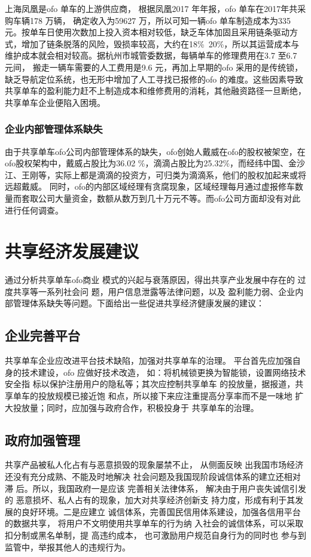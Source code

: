 \documentclass[a4paper,oneside,12pt]{article}
\begin{document}
上海凤凰是ofo 单车的上游供应商， 根据凤凰2017 年年报，ofo 单车在2017年共采购车辆178 万辆， 确定收入为59627 万，所以可知一辆ofo 单车制造成本为335 元。按单车日使用次数加上投入资本相对较低，缺乏车体加固且采用链条驱动方式，增加了链条脱落的风险，毁损率较高，大约在18\%~20\%，所以其运营成本与维护成本就会相对较高。据杭州市城管委数据，每辆单车的修理费用在3.7 至6.7 元间， 搬走一辆车需要的人工费用是9.6 元，再加上早期的ofo 采用的是传统锁，缺乏导航定位系统，也无形中增加了人工寻找已报修的ofo 的难度。这些因素导致共享单车的盈利能力赶不上制造成本和维修费用的消耗，其他融资路径一旦断绝，共享单车企业便陷入困境。


\subsubsection{企业内部管理体系缺失}
由于共享单车ofo公司内部管理体系的缺失，ofo创始人戴威在ofo的股权被架空，在ofo股权架构中，戴威占股比为36.02
\%，滴滴占股比为25.32\%，而经纬中国、金沙江、王刚等，实际上都是滴滴的投资方，可归类为滴滴系，他们的股权加起来或将远超戴威。
同时，ofo的内部区域经理有贪腐现象，区域经理每月通过虚报修车数量而套取公司大量资金，数额从数万到几十万元不等。而ofo公司方面却没有对此进行任何调查。

\section{共享经济发展建议}

通过分析共享单车ofo商业
模式的兴起与衰落原因，得出共享产业发展中存在的
过度共享等一系列社会问
题，用户信息泄露等法律问题，以及
盈利能力弱、企业内部管理体系缺失等问题。下面给出一些促进共享经济健康发展的建议：

\subsection{企业完善平台}
共享单车企业应改进平台技术缺陷，加强对共享单车的治理。
平台首先应加强自身的技术建设，ofo 应做好技术改造，
如：将机械锁更换为智能锁，设置网络技术安全指
标以保护注册用户的隐私等；其次应控制共享单车
的投放量，据报道，共享单车的投放规模已接近饱
和点，所以接下来应注重提高分享率而不是一味地
扩大投放量；同时，应加强与政府合作，积极投身于
共享单车的治理。
\subsection{政府加强管理}
共享产品被私人化占有与恶意损毁的现象屡禁不止， 从侧面反映
出我国市场经济还没有充分成熟、不能及时地解决
社会问题及我国现阶段诚信体系的建立还相对滞
后。所以，我国政府一是应该
完善相关法律体系， 解决由于用户丧失诚信引发的
恶意损坏、私人占有的现象，加大对共享经济创新支
持力度，形成有利于其发展的良好环境。二是应建立
诚信体系，完善国民信用体系建设，加强各信用平台
的数据共享， 将用户不文明使用共享单车的行为纳
入社会的诚信体系，可以采取扣分制或黑名单制，提
高违约成本， 也可激励用户规范自身行为的同时也
参与到监管中，举报其他人的违规行为。
\end{document}
